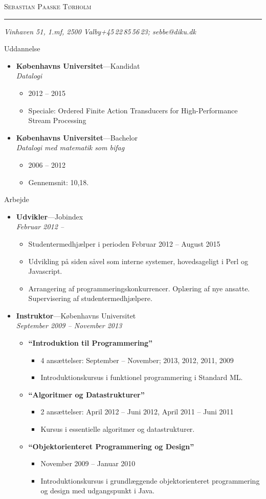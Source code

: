 \documentclass[11pt,oneside,a4paper]{article}
\makeatletter
\newcommand{\name}{Sebastian Paaske Tørholm}
\newcommand{\addr}{Vinhaven 51, 1.mf, 2500 Valby}
\newcommand{\phone}{+45\,22\,85\,56\,23}
\newcommand{\email}{sebbe@diku.dk}
\newcommand{\bigname}[1]{
    \begin{center}\fontfamily{phv}\selectfont\Huge\scshape#1\end{center}
}
\newenvironment{ressection}[1]{
    \vspace{4pt}
    {\fontfamily{phv}\selectfont\Large#1}
    \begin{itemize}
    \vspace{3pt}
}{
    \end{itemize}
}
\newcommand{\resitem}[1]{
    \vspace{-4pt}
    \item \begin{flushleft} #1 \end{flushleft}
}
\newcommand{\ressubitem}[1]{
    \vspace{-1pt}
    \item \begin{flushleft} #1 \end{flushleft}
}
\newcommand{\resbigitem}[3]{
    \vspace{-5pt}
    \item
    \textbf{#1}---#2 \\
    \textit{#3}
}
\newenvironment{ressubsec}[3]{
    \resbigitem{#1}{#2}{#3}
    \vspace{-2pt}
    \begin{itemize}
}{
    \end{itemize}
}
\newenvironment{reslist}[1]{
    \resitem{\textbf{#1}}
    \vspace{-2pt}
    \begin{itemize}
}{
    \end{itemize}
}
\makeatother
\begin{document}
 \selectfont

\bigname{\name}

\vspace{-8pt} \rule{\textwidth}{1pt}

\vspace{-1pt} {\small\itshape \addr \hfill \phone; \email}

\vspace{8 pt}




\begin{ressection}{Uddannelse}
    \begin{ressubsec}{Københavns Universitet}{Kandidat}{Datalogi}
        \ressubitem{2012 -- 2015}
        \ressubitem{Speciale: Ordered Finite Action Transducers for High-Performance Stream Processing}
    \end{ressubsec}

    \begin{ressubsec}{Københavns Universitet}{Bachelor}{Datalogi med matematik som bifag}
        \ressubitem{2006 -- 2012}
        \ressubitem{Gennemsnit: 10,18.}
    \end{ressubsec}

\end{ressection}


\begin{ressection}{Arbejde}
    \begin{ressubsec}{Udvikler}{Jobindex}{Februar 2012 -- }
        \ressubitem{Studentermedhjælper i perioden Februar 2012 -- August 2015}
        \ressubitem{Udvikling på siden såvel som interne systemer, hovedsageligt i Perl og Javascript.}
        \ressubitem{Arrangering af programmeringskonkurrencer. Oplæring af nye ansatte. Supervisering af studentermedhjælpere.}
    \end{ressubsec}

    \begin{ressubsec}{Instruktor}{Københavns Universitet}{September 2009 -- November 2013}
        \begin{reslist}{``Introduktion til Programmering''}
            \ressubitem{4 ansættelser: September -- November; 2013, 2012, 2011, 2009}
            \ressubitem{Introduktionskursus i funktionel programmering i Standard ML.}
        \end{reslist}
        \begin{reslist}{``Algoritmer og Datastrukturer''}
            \ressubitem{2 ansættelser: April 2012 -- Juni 2012, April 2011 -- Juni 2011}
            \ressubitem{Kursus i essentielle algoritmer og datastrukturer.}
        \end{reslist}
        \begin{reslist}{``Objektorienteret Programmering og Design''}
            \ressubitem{November 2009 -- Januar 2010}
            \ressubitem{Introduktionskursus i grundlæggende objektorienteret programmering og design med udgangspunkt i Java.}
        \end{reslist}
    \end{ressubsec}

\end{ressection}
\end{document}
